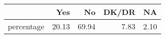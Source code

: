 \begin{table}[ht]
\centering
\begin{tabular}{rrrrr}
  \hline
 & Yes & No & DK/DR & NA \\ 
  \hline
percentage & 20.13 & 69.94 & 7.83 & 2.10 \\ 
   \hline
\end{tabular}
\end{table}
